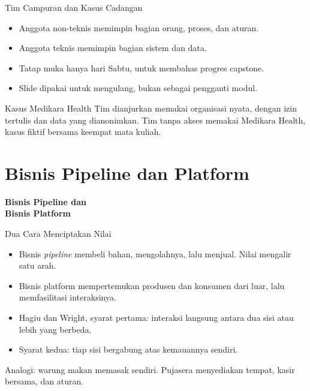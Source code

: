 \documentclass[aspectratio=169, table, 12pt]{beamer}
\begin{document}
\begin{frame}{{\Large Tim Campuran dan Kasus Cadangan}}
  \begin{itemize}
    \item Anggota non-teknis memimpin bagian orang, proses, dan aturan.
    \item Anggota teknis memimpin bagian sistem dan data.
    \item Tatap muka hanya hari Sabtu, untuk membahas progres capstone.
    \item Slide dipakai untuk mengulang, bukan sebagai pengganti modul.
  \end{itemize}
  \vspace{4pt}
  \begin{block}{Kasus Medikara Health}
    \small
    Tim dianjurkan memakai organisasi nyata, dengan izin tertulis dan data yang dianonimkan. Tim tanpa akses memakai Medikara Health, kasus fiktif bersama keempat mata kuliah.
  \end{block}
\end{frame}

\section{Bisnis Pipeline dan Platform}

\begin{frame}{\hfill}
  \centering
  \Huge{\textbf{Bisnis Pipeline dan\\Bisnis Platform}}
\end{frame}

\begin{frame}{{\Large Dua Cara Menciptakan Nilai}}
  \vspace{6pt}
  \begin{itemize}
    \item Bisnis \textit{pipeline} membeli bahan, mengolahnya, lalu menjual. Nilai mengalir satu arah.
    \item Bisnis platform mempertemukan produsen dan konsumen dari luar, lalu memfasilitasi interaksinya.
    \item Hagiu dan Wright, syarat pertama: interaksi langsung antara dua sisi atau lebih yang berbeda.
    \item Syarat kedua: tiap sisi bergabung atas kemauannya sendiri.
  \end{itemize}
  \vspace{4pt}
  {\small Analogi: warung makan memasak sendiri. Pujasera menyediakan tempat, kasir bersama, dan aturan.}
\end{frame}
\end{document}

